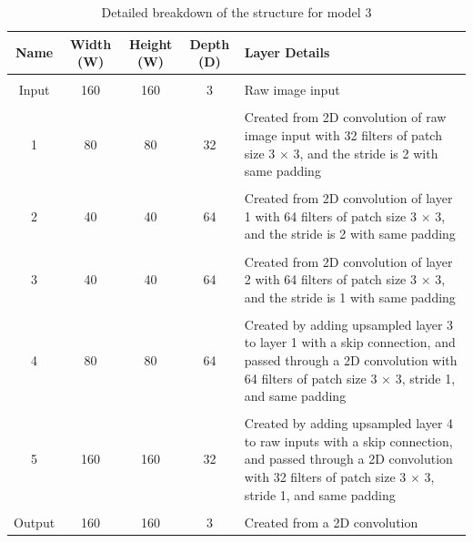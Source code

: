 \documentclass[a4paper]{article}
\begin{document}
\begin{table}[h]
\centering
\caption{Detailed breakdown of the structure for model 3}\scriptsize
\begin{tabular}{ccccp{8cm}}
\toprule
\textbf{Name} & \textbf{Width (W)} & \textbf{Height (W)} & \textbf{Depth (D)} & Layer Details\\  
\midrule
 & & & &\\
Input & 160 & 160 & 3 & Raw image input\\
 & & & &\\
1 & 80 & 80 & 32 & Created from 2D convolution of raw image input with 32 filters of patch size 3 $\times $ 3, and the stride is 2 with same padding\\
 & & & &\\
2 & 40 & 40 & 64 & Created from 2D convolution of layer 1 with 64 filters of patch size 3 $\times $ 3, and the stride is 2 with same padding\\
 & & & &\\
3 & 40 & 40 & 64 & Created from 2D convolution of layer 2 with 64 filters of patch size 3 $\times$ 3, and the stride is 1 with same padding\\
 & & & &\\
4 & 80 & 80 & 64 & Created by adding upsampled layer 3 to layer 1 with a skip connection, and passed through a 2D convolution with 64 filters of patch size 3 $\times$ 3, stride 1, and same padding\\
 & & & &\\
5 & 160 & 160 & 32 & Created by adding upsampled layer 4 to raw inputs with a skip connection, and passed through a 2D convolution with 32 filters of patch size 3 $\times$ 3, stride 1, and same padding\\
& & & &\\
Output & 160 & 160 & 3 & Created from a 2D convolution\\
\bottomrule
\end{tabular}
\end{table}

\clearpage
\end{document}
